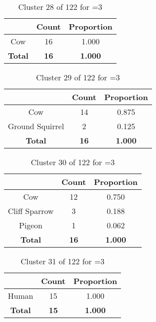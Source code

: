 \begin{table}[ht!]
\centering
\begin{tabular}{|c|c|c|}
\hline
\bf \Spec{} &\bf Count &\bf Proportion\\ \hline \hline
Cow & 16 & 1.000\\ \hline
\hline
\bf Total & \bf 16 & \bf 1.000\\ \hline
\end{tabular}
\label{tab:cluster:28:3}
\caption{Cluster 28 of 122 for \minneigh{}=3}
\end{table}

\begin{table}[ht!]
\centering
\begin{tabular}{|c|c|c|}
\hline
\bf \Spec{} &\bf Count &\bf Proportion\\ \hline \hline
Cow & 14 & 0.875\\ \hline
Ground Squirrel & 2 & 0.125\\ \hline
\hline
\bf Total & \bf 16 & \bf 1.000\\ \hline
\end{tabular}
\label{tab:cluster:29:3}
\caption{Cluster 29 of 122 for \minneigh{}=3}
\end{table}

\clearpage
\begin{table}[ht!]
\centering
\begin{tabular}{|c|c|c|}
\hline
\bf \Spec{} &\bf Count &\bf Proportion\\ \hline \hline
Cow & 12 & 0.750\\ \hline
Cliff Sparrow & 3 & 0.188\\ \hline
Pigeon & 1 & 0.062\\ \hline
\hline
\bf Total & \bf 16 & \bf 1.000\\ \hline
\end{tabular}
\label{tab:cluster:30:3}
\caption{Cluster 30 of 122 for \minneigh{}=3}
\end{table}

\begin{table}[ht!]
\centering
\begin{tabular}{|c|c|c|}
\hline
\bf \Spec{} &\bf Count &\bf Proportion\\ \hline \hline
Human & 15 & 1.000\\ \hline
\hline
\bf Total & \bf 15 & \bf 1.000\\ \hline
\end{tabular}
\label{tab:cluster:31:3}
\caption{Cluster 31 of 122 for \minneigh{}=3}
\end{table}

